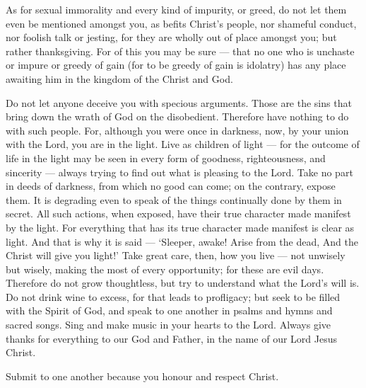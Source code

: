  As for sexual immorality and every kind of impurity, or
greed, do not let them even be mentioned amongst you, as befits Christ's
people,  nor shameful conduct, nor foolish talk or jesting,
for they are wholly out of place amongst you; but rather thanksgiving.
 For of this you may be sure --- that no one who is unchaste
or impure or greedy of gain (for to be greedy of gain is idolatry) has
any place awaiting him in the kingdom of the Christ and God.

 Do not let anyone deceive you with specious arguments.
Those are the sins that bring down the wrath of God on the disobedient.
 Therefore have nothing to do with such people. 
For, although you were once in darkness, now, by your union with the
Lord, you are in the light. Live as children of light --- 
for the outcome of life in the light may be seen in every form of
goodness, righteousness, and sincerity ---  always trying
to find out what is pleasing to the Lord.  Take no part in
deeds of darkness, from which no good can come; on the contrary, expose
them.  It is degrading even to speak of the things
continually done by them in secret.  All such actions, when
exposed, have their true character made manifest by the light.
 For everything that has its true character made manifest
is clear as light. And that is why it is said --- `Sleeper, awake! Arise
from the dead, And the Christ will give you light!'  Take
great care, then, how you live --- not unwisely but wisely,
 making the most of every opportunity; for these are evil
days.  Therefore do not grow thoughtless, but try to
understand what the Lord's will is.  Do not drink wine to
excess, for that leads to profligacy; but seek to be filled with the
Spirit of God, and speak to one another in psalms and hymns and sacred
songs.  Sing and make music in your hearts to the Lord.
 Always give thanks for everything to our God and Father,
in the name of our Lord Jesus Christ.

 Submit to one another because you honour and respect
Christ.

